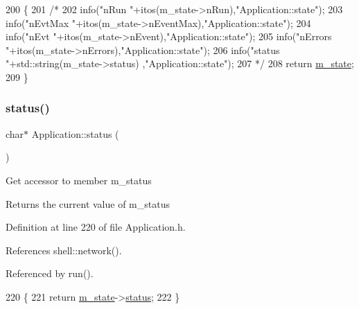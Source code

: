 \begin{DoxyCode}
200                             \{
201   \textcolor{comment}{/*}
202 \textcolor{comment}{    info("nRun    "+itos(m\_state->nRun),"Application::state");
}
203 \textcolor{comment}{    info("nEvtMax "+itos(m\_state->nEventMax),"Application::state");
}
204 \textcolor{comment}{    info("nEvt    "+itos(m\_state->nEvent),"Application::state");
}
205 \textcolor{comment}{    info("nErrors "+itos(m\_state->nErrors),"Application::state");
}
206 \textcolor{comment}{    info("status  "+std::string(m\_state->status) ,"Application::state");
}
207 \textcolor{comment}{  */}
208   \textcolor{keywordflow}{return} \hyperlink{classApplication_a0ef9832e2d286716e597a1ff21ffcab4}{m\_state};
209 \}
\end{DoxyCode}
\mbox{\label{classApplication_ad429c4d2322f706e3564c1ee05d38ff1}} 
\subsubsection{\texorpdfstring{status()}{status()}}
{\footnotesize\ttfamily char$\ast$ Application\+::status (\begin{DoxyParamCaption}{ }\end{DoxyParamCaption})\hspace{0.3cm}{\ttfamily [inline]}}

Get accessor to member m\+\_\+status \begin{DoxyReturn}{Returns}
the current value of m\+\_\+status 
\end{DoxyReturn}


Definition at line 220 of file Application.\+h.



References shell\+::network().



Referenced by run().


\begin{DoxyCode}
220                   \{
221     \textcolor{keywordflow}{return} \hyperlink{classApplication_a0ef9832e2d286716e597a1ff21ffcab4}{m\_state}->\hyperlink{classState_aaec062c78d5602d066a7960a2e08e1cd}{status};
222   \}
\end{DoxyCode}
\mbox{\label{classApplication_a297f55c288c32cbdadadcbbc26ae7692}} 
